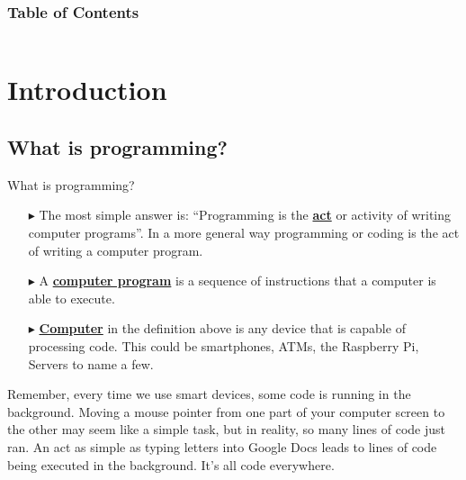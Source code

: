 \documentclass[aspectratio=169]{beamer}
\begin{document}
\begin{frame}
\frametitle{Table of Contents}
    \begin{columns}[t]
        \begin{column}{0.5\textwidth}
            \hypersetup{linkcolor=accentcolor}{\tableofcontents[sections={1-3}]}
        \end{column}
        \begin{column}{0.5\textwidth}
            \hypersetup{linkcolor=accentcolor}{\tableofcontents[sections={4-8}]}
        \end{column}
    \end{columns}
\end{frame}

\section{Introduction}
\subsection{What is programming?}
\begin{frame}{What is programming?}
    \small{
        \begin{itemize}[<+->]
            \item[$\blacktriangleright$]
            The most simple answer is: ``Programming is the \underline{\textbf{act}} or activity of writing computer programs''. In a more general way programming or coding is the act of writing a computer program.

            \item[$\blacktriangleright$]
            A \underline{\textbf{computer program}} is a sequence of instructions that a computer is able to execute.

            \item[$\blacktriangleright$]
            \underline{\textbf{Computer}} in the definition above is any device that is capable of processing code. This could be smartphones, ATMs, the Raspberry Pi, Servers to name a few.
        \end{itemize}

        \pause
        Remember, every time we use smart devices, some code is running in the background. Moving a mouse pointer from one part of your computer screen to the other may seem like a simple task, but in reality, so many lines of code just ran. An act as simple as typing letters into Google Docs leads to lines of code being executed in the background. It’s all code everywhere.
    }
\end{frame}
\end{document}
